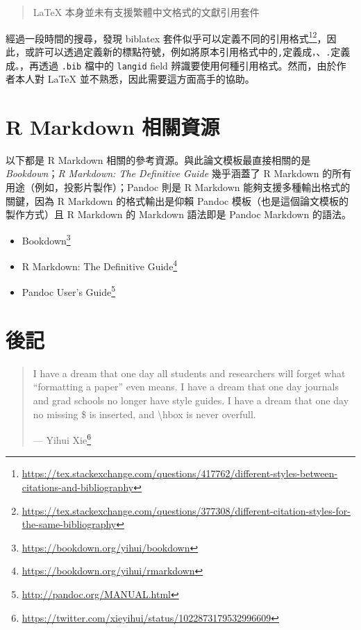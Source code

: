 \documentclass[oneside]{book}
\renewcommand{\href}[2]{#2\footnote{\url{#1}}}
\theoremstyle{definition}
\theoremstyle{definition}
\theoremstyle{definition}
\theoremstyle{remark}
\begin{document}
\begin{quote}
LaTeX 本身並未有支援繁體中文格式的文獻引用套件
\end{quote}

經過一段時間的搜尋，發現 biblatex
套件似乎可以定義不同的引用格式\footnote{\url{https://tex.stackexchange.com/questions/417762/different-styles-between-citations-and-bibliography}}\footnote{\url{https://tex.stackexchange.com/questions/377308/different-citation-styles-for-the-same-bibliography}}，因此，或許可以透過定義新的標點符號，例如將原本引用格式中的\texttt{,}定義成\texttt{，}、\texttt{.}定義成\texttt{。}，再透過
\texttt{.bib} 檔中的 \texttt{langid} field
辨識要使用何種引用格式。然而，由於作者本人對 LaTeX
並不熟悉，因此需要這方面高手的協助。

\chapter{R Markdown 相關資源}\label{rmd-resources}

以下都是 R Markdown 相關的參考資源。與此論文模板最直接相關的是
\emph{Bookdown}；\emph{R Markdown: The Definitive Guide} 幾乎涵蓋了 R
Markdown 的所有用途（例如，投影片製作）；Pandoc 則是 R Markdown
能夠支援多種輸出格式的關鍵，因為 R Markdown 的格式輸出是仰賴 Pandoc
模板（也是這個論文模板的製作方式）且 R Markdown 的 Markdown 語法即是
Pandoc Markdown 的語法。

\begin{itemize}
\item
  \href{https://bookdown.org/yihui/bookdown}{Bookdown}
\item
  \href{https://bookdown.org/yihui/rmarkdown}{R Markdown: The Definitive
  Guide}
\item
  \href{http://pandoc.org/MANUAL.html}{Pandoc User's Guide}
\end{itemize}

\chapter{後記}\label{epilogue}

\begin{quote}
I have a dream that one day all students and researchers will forget
what ``formatting a paper'' even means. I have a dream that one day
journals and grad schools no longer have style guides. I have a dream
that one day no missing \$ is inserted, and \textbackslash{}hbox is
never overfull.

\hspace*{\fill} ---
\href{https://twitter.com/xieyihui/status/1022873179532996609}{Yihui
Xie}
\end{quote}
\end{document}
